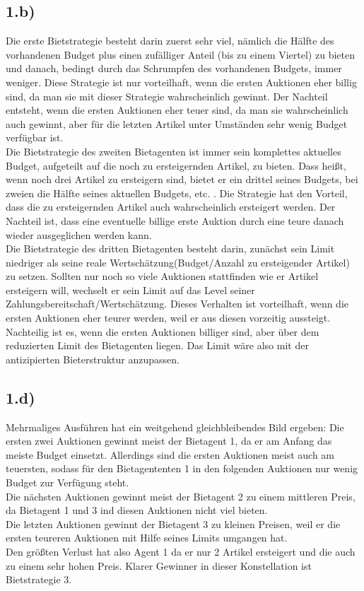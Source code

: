 \documentclass[a4paper]{article}
\begin{document}
	\subsection*{1.b)}
	Die erste Bietstrategie besteht darin zuerst sehr viel, nämlich die Hälfte des vorhandenen Budget plus einen zufälliger Anteil (bis zu einem Viertel) zu bieten und danach, bedingt durch das Schrumpfen des vorhandenen Budgets, immer weniger. Diese Strategie ist nur vorteilhaft, wenn die ersten Auktionen eher billig sind, da man sie mit dieser Strategie wahrscheinlich gewinnt. Der Nachteil entsteht, wenn die ersten Auktionen eher teuer sind, da man sie wahrscheinlich auch gewinnt, aber für die letzten Artikel unter Umständen sehr wenig Budget verfügbar ist.\\
	Die Bietstrategie des zweiten Bietagenten ist immer sein komplettes aktuelles Budget, aufgeteilt auf die noch zu ersteigernden Artikel, zu bieten. Dass heißt, wenn noch drei Artikel zu ersteigern sind, bietet er ein drittel seines Budgets, bei zweien die Hälfte seines aktuellen Budgets, etc. . Die Strategie hat den Vorteil, dass die zu ersteigernden Artikel auch wahrscheinlich ersteigert werden. Der Nachteil ist, dass eine eventuelle billige erste Auktion durch eine teure danach wieder ausgeglichen werden kann.\\
	Die Bietstrategie des dritten Bietagenten besteht darin, zunächst sein Limit niedriger als seine reale Wertschätzung(Budget/Anzahl zu ersteigender Artikel) zu setzen. Sollten nur noch so viele Auktionen stattfinden wie er Artikel ersteigern will, wechselt er sein Limit auf das Level seiner Zahlungsbereitschaft/Wertschätzung. Dieses Verhalten ist vorteilhaft, wenn die ersten Auktionen eher teurer werden, weil er aus diesen vorzeitig aussteigt. Nachteilig ist es, wenn die ersten Auktionen billiger sind, aber über dem reduzierten Limit des Bietagenten liegen. Das Limit wäre also mit der antizipierten Bieterstruktur anzupassen.
	
	\subsection*{1.d)}
	Mehrmaliges Ausführen hat ein weitgehend gleichbleibendes Bild ergeben: Die ersten zwei Auktionen gewinnt meist der Bietagent 1, da er am Anfang das meiste Budget einsetzt. Allerdings sind die ersten Auktionen meist auch am teuersten, sodass für den Bietagententen 1 in den folgenden Auktionen nur wenig Budget zur Verfügung steht. \\
	Die nächsten Auktionen gewinnt meist der Bietagent 2 zu einem mittleren Preis, da Bietagent 1 und 3 ind diesen Auktionen nicht viel bieten.\\
	Die letzten Auktionen gewinnt der Bietagent 3 zu kleinen Preisen, weil er die ersten teureren Auktionen mit Hilfe seines Limits umgangen hat.\\
	Den größten Verlust hat also Agent 1 da er nur 2 Artikel ersteigert und die auch zu einem sehr hohen Preis. Klarer Gewinner in dieser Konstellation ist Bietstrategie 3.
\end{document}
